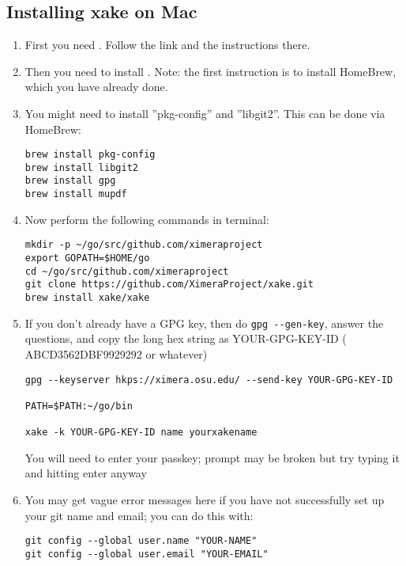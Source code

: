 \documentclass{ximera}
\begin{document}
\subsection{Installing xake on Mac}

\begin{enumerate}
\item First you need . Follow the link and the instructions there.
\item Then you need to install . Note: the first instruction is to install HomeBrew, which you have already done. 
\item You might need to install ''pkg-config” and ''libgit2”. This can be done via HomeBrew:
\begin{verbatim}
brew install pkg-config
brew install libgit2
brew install gpg
brew install mupdf
\end{verbatim}
\item Now perform the following commands in terminal:
\begin{verbatim}
mkdir -p ~/go/src/github.com/ximeraproject
export GOPATH=$HOME/go
cd ~/go/src/github.com/ximeraproject
git clone https://github.com/XimeraProject/xake.git
brew install xake/xake
\end{verbatim}

\item If you don’t already have a GPG key, then do
\verb!gpg --gen-key!, answer the questions, and copy the long hex string as YOUR-GPG-KEY-ID ( ABCD3562DBF9929292 or whatever)
\begin{verbatim}
gpg --keyserver hkps://ximera.osu.edu/ --send-key YOUR-GPG-KEY-ID

PATH=$PATH:~/go/bin

xake -k YOUR-GPG-KEY-ID name yourxakename
\end{verbatim}
You will need to enter your passkey; prompt may be broken but try typing it and hitting enter anyway

\item You may get vague error messages here if you have not successfully set up your git name and email; you can do this with:
\begin{verbatim}
git config --global user.name "YOUR-NAME"
git config --global user.email "YOUR-EMAIL"
\end{verbatim}
\end{enumerate}
\end{document}
